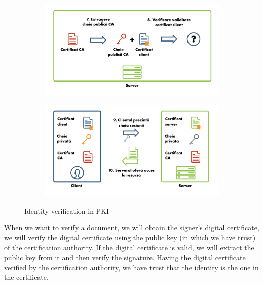 \begin{figure}[htbp]
\begin{subfigure}[b]{0.48\textwidth}
  \end{subfigure}
  \begin{subfigure}[b]{0.48\textwidth}
    \centering
    \def\svgwidth{\columnwidth}
    \includegraphics{chapters/12-auth/img/certificate-7-8.svg.pdf}
  \end{subfigure}
  \begin{subfigure}[b]{0.48\textwidth}
    \centering
    \def\svgwidth{\columnwidth}
    \includegraphics{chapters/12-auth/img/certificate-9-10.svg.pdf}
  \end{subfigure}
  \caption{Identity verification in PKI}
  \label{fig:sec:pki}
\end{figure}

When we want to verify a document, we will obtain the signer's digital certificate, we will verify the digital certificate using the public key (in which we have trust) of the certification authority.
If the digital certificate is valid, we will extract the public key from it and then verify the signature.
Having the digital certificate verified by the certification authority, we have trust that the identity is the one in the certificate.

